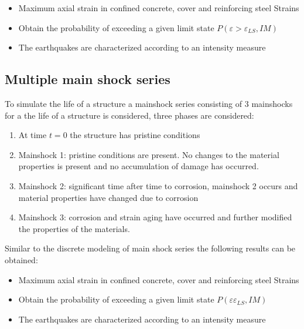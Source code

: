 \begin{itemize}
	\item Maximum axial strain in confined concrete, cover and reinforcing steel 
Strains
	\item Obtain the probability of exceeding a given limit state $P(\varepsilon >\varepsilon_{LS},IM)$
	\item The earthquakes are characterized according to an intensity measure

\end{itemize}


\subsection{Multiple main shock series}

To simulate the life of a structure a mainshock series consisting of 3 mainshocks for a the life of a structure is considered, three phases are considered:
\begin{enumerate}

	\item At time $t=0$ the structure has pristine conditions
	\item Mainshock 1: pristine conditions are present. No changes to the material properties is present and no accumulation of damage has occurred.
	\item Mainshock 2: significant time after time to corrosion, mainshock 2 occurs and  material properties have changed due to corrosion
	\item Mainshock 3: corrosion and strain aging have occurred and further modified the properties of the materials.
\end{enumerate}

%

Similar to the discrete modeling of main shock series the following results can be obtained:

\begin{itemize}
	\item Maximum axial strain in confined concrete, cover and reinforcing steel 
Strains
	\item Obtain the probability of exceeding a given limit state $P(\varepsilon\varepsilon_{LS},IM)$
	\item The earthquakes are characterized according to an intensity measure

\end{itemize}

